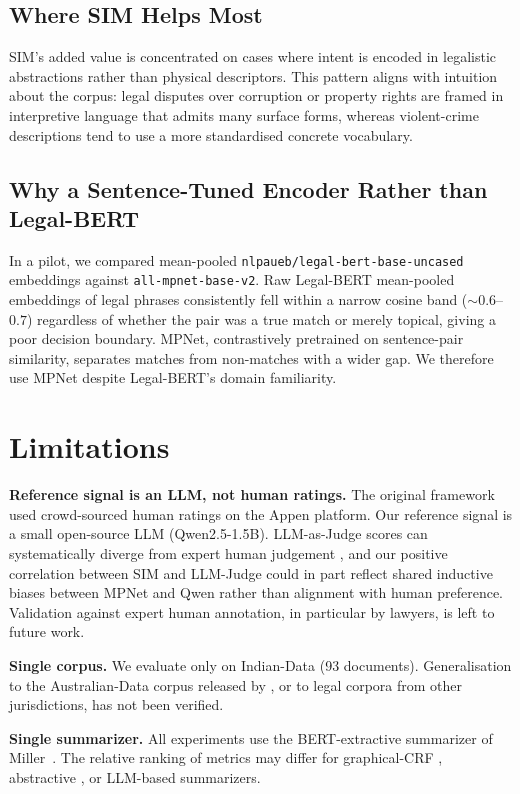 \documentclass[conference,a4paper]{IEEEtran}
\begin{document}
\subsection{Where SIM Helps Most}
SIM's added value is concentrated on cases where intent is encoded in legalistic abstractions rather than physical descriptors. This pattern aligns with intuition about the corpus: legal disputes over corruption or property rights are framed in interpretive language that admits many surface forms, whereas violent-crime descriptions tend to use a more standardised concrete vocabulary.

\subsection{Why a Sentence-Tuned Encoder Rather than Legal-BERT}
In a pilot, we compared mean-pooled \texttt{nlpaueb/legal-bert-base-uncased} embeddings against \texttt{all-mpnet-base-v2}. Raw Legal-BERT mean-pooled embeddings of legal phrases consistently fell within a narrow cosine band ($\sim 0.6$--$0.7$) regardless of whether the pair was a true match or merely topical, giving a poor decision boundary. MPNet, contrastively pretrained on sentence-pair similarity, separates matches from non-matches with a wider gap. We therefore use MPNet despite Legal-BERT's domain familiarity.

\section{Limitations}

\textbf{Reference signal is an LLM, not human ratings.} The original \cite{mullick2022} framework used crowd-sourced human ratings on the Appen platform. Our reference signal is a small open-source LLM (Qwen2.5-1.5B). LLM-as-Judge scores can systematically diverge from expert human judgement \cite{zheng2023judging}, and our positive correlation between SIM and LLM-Judge could in part reflect shared inductive biases between MPNet and Qwen rather than alignment with human preference. Validation against expert human annotation, in particular by lawyers, is left to future work.

\textbf{Single corpus.} We evaluate only on Indian-Data (93 documents). Generalisation to the Australian-Data corpus released by \cite{mullick2022}, or to legal corpora from other jurisdictions, has not been verified.

\textbf{Single summarizer.} All experiments use the BERT-extractive summarizer of Miller~\cite{miller2019leveraging}. The relative ranking of metrics may differ for graphical-CRF \cite{saravanan2006improving}, abstractive \cite{beltagy2020longformer}, or LLM-based summarizers.
\end{document}
